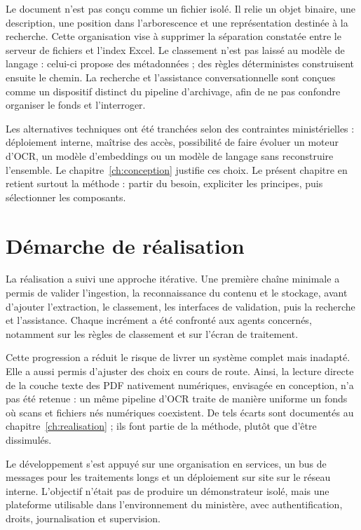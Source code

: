 Le document n'est pas conçu comme un fichier isolé. Il relie un objet binaire, une description, une position dans l'arborescence et une représentation destinée à la recherche. Cette organisation vise à supprimer la séparation constatée entre le serveur de fichiers et l'index Excel. Le classement n'est pas laissé au modèle de langage : celui-ci propose des métadonnées ; des règles déterministes construisent ensuite le chemin. La recherche et l'assistance conversationnelle sont conçues comme un dispositif distinct du pipeline d'archivage, afin de ne pas confondre organiser le fonds et l'interroger.

Les alternatives techniques ont été tranchées selon des contraintes ministérielles : déploiement interne, maîtrise des accès, possibilité de faire évoluer un moteur d'OCR, un modèle d'embeddings ou un modèle de langage sans reconstruire l'ensemble. Le chapitre~\ref{ch:conception} justifie ces choix. Le présent chapitre en retient surtout la méthode : partir du besoin, expliciter les principes, puis sélectionner les composants.

\section{Démarche de réalisation}

La réalisation a suivi une approche itérative. Une première chaîne minimale a permis de valider l'ingestion, la reconnaissance du contenu et le stockage, avant d'ajouter l'extraction, le classement, les interfaces de validation, puis la recherche et l'assistance. Chaque incrément a été confronté aux agents concernés, notamment sur les règles de classement et sur l'écran de traitement.

Cette progression a réduit le risque de livrer un système complet mais inadapté. Elle a aussi permis d'ajuster des choix en cours de route. Ainsi, la lecture directe de la couche texte des PDF nativement numériques, envisagée en conception, n'a pas été retenue : un même pipeline d'OCR traite de manière uniforme un fonds où scans et fichiers nés numériques coexistent. De tels écarts sont documentés au chapitre~\ref{ch:realisation} ; ils font partie de la méthode, plutôt que d'être dissimulés.

Le développement s'est appuyé sur une organisation en services, un bus de messages pour les traitements longs et un déploiement sur site sur le réseau interne. L'objectif n'était pas de produire un démonstrateur isolé, mais une plateforme utilisable dans l'environnement du ministère, avec authentification, droits, journalisation et supervision.

